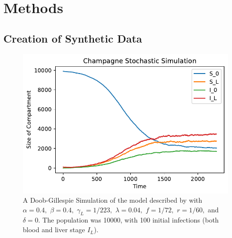 \chapter{Methods}

\section{Creation of Synthetic Data}

\begin{figure}[htbp]
    \centering
    \includegraphics[width = \textwidth]{
        ../champagne_GP_images/champagne_simulation.pdf
    }
    \caption{
        A Doob-Gillespie Simulation of the model described by
        \cite{champagne_using_2022} with $\alpha = 0.4,$ $\beta = 0.4,$
        $\gamma_L = 1 / 223,$ $\lambda = 0.04,$ $f = 1 / 72,$ $r = 1 / 60,$ and
        $\delta = 0.$ The population was 10000, with 100 initial infections
        (both blood and liver stage $I_L$).
    }
    \label{fig:champ_doob}
\end{figure}

